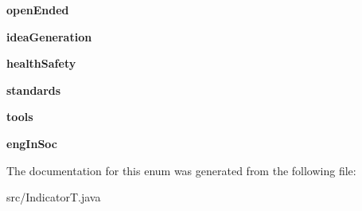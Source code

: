 \begin{DoxyCompactItemize}
{\bfseries open\+Ended}
\item 
\mbox{\label{enumsrc_1_1IndicatorT_ab93613870b8a1e56292bfbc7139d12cd}} 
{\bfseries idea\+Generation}
\item 
\mbox{\label{enumsrc_1_1IndicatorT_ad24b90b54bdf6b8242e75acce1d76603}} 
{\bfseries health\+Safety}
\item 
\mbox{\label{enumsrc_1_1IndicatorT_a38d0cec683c88ebf0504bcb9482fa2ee}} 
{\bfseries standards}
\item 
\mbox{\label{enumsrc_1_1IndicatorT_a6b73ab1cacc8a99a0eb24662eef36ef7}} 
{\bfseries tools}
\item 
\mbox{\label{enumsrc_1_1IndicatorT_a68375853098407f101d108d27c8ccfba}} 
{\bfseries eng\+In\+Soc}
\end{DoxyCompactItemize}


The documentation for this enum was generated from the following file\+:\begin{DoxyCompactItemize}
\item 
src/Indicator\+T.\+java\end{DoxyCompactItemize}
